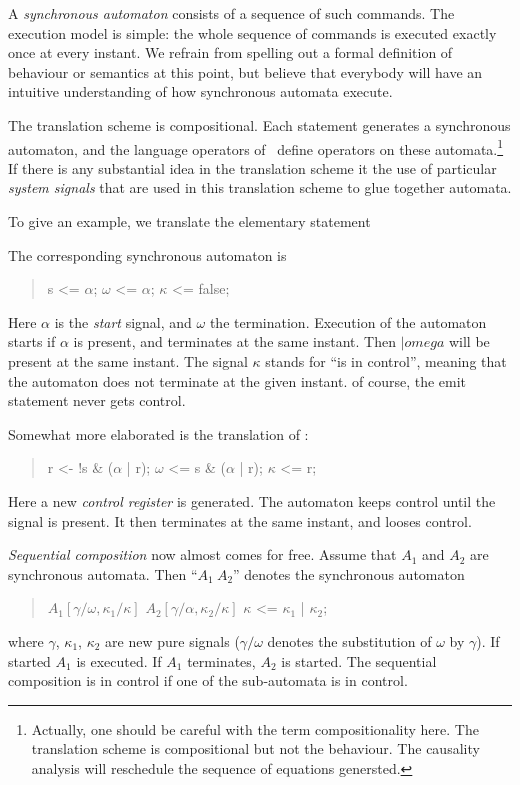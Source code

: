 A \emph{synchronous automaton} consists of a sequence of such commands. The 
execution model is simple: the whole sequence of commands is executed exactly 
once at every instant. We refrain from spelling out a formal definition
of behaviour or semantics at this point, but believe that everybody will
have an intuitive understanding of how synchronous automata execute.

The translation scheme is compositional. Each statement generates a synchronous automaton, and the language operators of \se\ define operators on these automata.\footnote{Actually, one should be careful with the term compositionality here. The translation scheme is compositional but not the behaviour. The causality analysis will reschedule the sequence of equations genersted.} If there is any substantial idea in the translation scheme it the use of particular \emph{system signals} that are used in this translation scheme to glue together automata.

To give an example, we translate the elementary statement
\begin{center}
\end{center}
The corresponding synchronous automaton is
\begin{quote} 
\BEP
 s <= $\alpha$;
 $\omega$ <= $\alpha$;
 $\kappa$ <= false;
\EEP
\end{quote}
Here $\alpha$ is the \emph{start} signal, and $\omega$ the termination. Execution of the automaton starts if $\alpha$ is present, and terminates
at the same instant. Then $|omega$ will be present at the same instant.
The signal $\kappa$ stands for ``is in control'', meaning that the automaton
does not terminate at the given instant. of course, the emit statement
never gets control.

Somewhat more elaborated is the translation of :
\begin{quote} 
\BEP
    r <- !s \& ($\alpha$ | r);
    $\omega$ <=  s \& ($\alpha$ | r);
    $\kappa$ <= r;
\EEP
\end{quote}
Here a new \emph{control register}  is generated. The automaton keeps
control until the signal  is present. It then terminates at the same
instant, and looses control.

\emph{Sequential composition} now almost comes for free. Assume that $A_{1}$ and $A_{2}$ are synchronous automata. Then ``$A_{1}\ A_{2}$'' denotes the synchronous automaton
\begin{quote} 
\BEP
 $A_{1}[\gamma/\omega,\kappa_{1}/\kappa]$
 $A_{2}[\gamma/\alpha,\kappa_{2}/\kappa]$
 $\kappa$ <= $\kappa_{1}$ | $\kappa_{2}$;
\EEP
\end{quote}
where $\gamma$, $\kappa_{1}$, $\kappa_{2}$ are new pure signals ($\gamma/\omega$ denotes the substitution of $\omega$ by $\gamma$). If started $A_{1}$ is executed. If $A_{1}$ terminates, $A_{2}$ is started. The sequential composition is in control if one of the sub-automata is in control.

